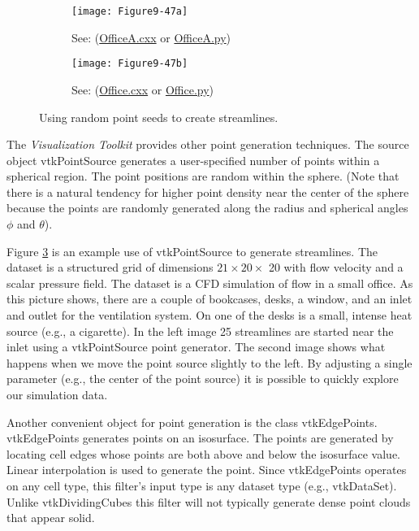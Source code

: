 \begin{figure}[htb]
	\begin{subfigure}[h]{0.48\linewidth}
		\texttt{[image: Figure9-47a]}
		\captionsetup{justification=centering}
		\caption*{See: (\href{https://lorensen.github.io/VTKExamples/site/Cxx/VisualizationAlgorithms/OfficeA/}{OfficeA.cxx} or \href{https://lorensen.github.io/VTKExamples/site/Python/VisualizationAlgorithms/OfficeA/}{OfficeA.py})}
		\label{fig:Figure9-47a}
	\end{subfigure}
	\hfill
	\begin{subfigure}[h]{0.48\linewidth}
		\texttt{[image: Figure9-47b]}
		\captionsetup{justification=centering}
		\caption*{See: (\href{https://lorensen.github.io/VTKExamples/site/Cxx/VisualizationAlgorithms/Office/}{Office.cxx} or \href{https://lorensen.github.io/VTKExamples/site/Python/VisualizationAlgorithms/Office/}{Office.py})}
		\label{fig:Figure9-47b}
	\end{subfigure}
	\caption{Using random point seeds to create streamlines.}\label{fig:Figure9-47}
\end{figure}

The \emph{Visualization Toolkit} provides other point generation techniques. The source object vtkPointSource generates a user-specified number of points within a spherical region. The point positions are random within the sphere. (Note that there is a natural tendency for higher point density near the center of the sphere because the points are randomly generated along the radius and spherical angles $\phi$ and $\theta$).

Figure \ref{fig:Figure9-47} is an example use of vtkPointSource to generate streamlines. The dataset is a structured grid of dimensions $21 \times 20 \times$ 20 with flow velocity and a scalar pressure field. The dataset is a CFD simulation of flow in a small office. As this picture shows, there are a couple of bookcases, desks, a window, and an inlet and outlet for the ventilation system. On one of the desks is a small, intense heat source (e.g., a cigarette). In the left image 25 streamlines are started near the inlet using a vtkPointSource point generator. The second image shows what happens when we move the point source slightly to the left. By adjusting a single parameter (e.g., the center of the point source) it is possible to quickly explore our simulation data.

Another convenient object for point generation is the class vtkEdgePoints. vtkEdgePoints generates points on an isosurface. The points are generated by locating cell edges whose points are both above and below the isosurface value. Linear interpolation is used to generate the point. Since vtkEdgePoints operates on any cell type, this filter's input type is any dataset type (e.g., vtkDataSet). Unlike vtkDividingCubes this filter will not typically generate dense point clouds that appear solid.

